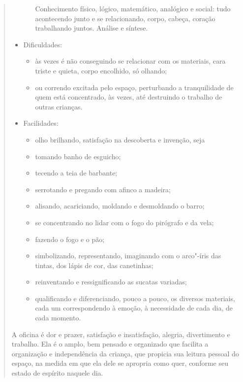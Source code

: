 \begin{quote}
\begin{itemize}
\begin{itemize}
    Conhecimento físico, lógico, matemático, analógico e social: tudo
    acontecendo junto e se relacionando, corpo, cabeça, coração
    trabalhando juntos. Análise e síntese.
  \end{itemize}
\item
  Dificuldades:
  \begin{itemize}
  \item
    às vezes é não conseguindo se relacionar com os materiais, cara
    triste e quieta, corpo encolhido, só olhando;
  \item
    ou correndo excitada pelo espaço, perturbando a tranquilidade de
    quem está concentrado, às vezes, até destruindo o trabalho de outras
    crianças.
  \end{itemize}
\item
  Facilidades:
  \begin{itemize}
  \item
    olho brilhando, satisfação na descoberta e invenção, seja
  \item
    tomando banho de esguicho;
  \item
    tecendo a teia de barbante;
  \item
    serrotando e pregando com afinco a madeira;
  \item
    alisando, acariciando, moldando e desmoldando o barro;
  \item
    se concentrando no lidar com o fogo do pirógrafo e da vela;
  \item
    fazendo o fogo e o pão;
  \item
    simbolizando, representando, imaginando com o arco"-íris das tintas,
    dos lápis de cor, das canetinhas;
  \item
    reinventando e ressignificando as sucatas variadas;
  \item
    qualificando e diferenciando, pouco a pouco, os diversos materiais,
    cada um correspondendo à emoção, à necessidade de cada dia, de cada
    momento.
  \end{itemize}
\end{itemize}
A oficina é dor e prazer, satisfação e insatisfação, alegria,
divertimento e trabalho. Ela é o  amplo, bem pensado e organizado
que facilita a organização e independência da criança, que propicia sua
leitura pessoal do espaço, na medida em que ela dele se apropria como
quer, conforme seu estado de espírito naquele dia.


\end{quote}
